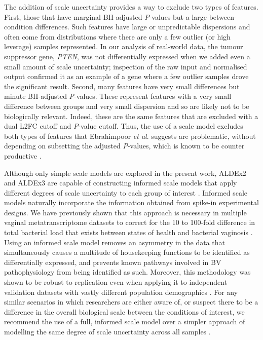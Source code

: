 \documentclass[10pt,letterpaper]{article}
\begin{document}
The addition of scale uncertainty provides a way to exclude two types of features. First, those that have marginal BH-adjusted \textit{P}-values but a large between-condition differences. Such features have large or unpredictable dispersions and often come from distributions where there are only a few outlier (or high leverage) samples represented. In our analysis of real-world data, the tumour suppressor gene, \textit{PTEN}, was not differentially expressed when we added even a small amount of scale uncertainty; inspection of the raw input and normalised output confirmed it as an example of a gene where a few outlier samples drove the significant result. Second, many features have very small differences but minute BH-adjusted \textit{P}-values. These represent features with a very small difference between groups and very small dispersion and so are likely not to be biologically relevant. Indeed, these are the same features that are excluded with a dual L2FC cutoff and \textit{P}-value cutoff. Thus, the use of a scale model excludes both types of features that Ebrahimpoor \textit{et al}. \cite{ebrahimpoor_inflated_2021} suggests are problematic, without depending on subsetting the adjusted \textit{P}-values, which is known to be counter productive \cite{Goeman:2014aa, ebrahimpoor_inflated_2021}.

Although only simple scale models are explored in the present work, ALDEx2 and ALDEx3 are capable of constructing informed scale models that apply different degrees of scale uncertainty to each group of interest \cite{nixon_scale_2024, nixon_incorporating_2025}. Informed scale models naturally incorporate the information obtained from spike-in experimental designs. We have previously shown\cite{dos_santos_vaginal_2024, dos_santos_incorporating_2026} that this approach is necessary in multiple vaginal metatranscriptome datasets to correct for the 10 to 100-fold difference in total bacterial load that exists between states of health and bacterial vaginosis \cite{zozaya-hinchliffe_quantitative_2010}. Using an informed scale model removes an asymmetry in the data that simultaneously causes a multitude of housekeeping functions to be identified as differentially expressed, and prevents known pathways involved in BV pathophysiology from being identified as such. Moreover, this methodology was shown to be robust to replication even when applying it to independent validation datasets with vastly different population demographics \cite{dos_santos_vaginal_2024}. For any similar scenarios in which researchers are either aware of, or suspect there to be a difference in the overall biological scale between the conditions of interest, we recommend the use of a full, informed scale model over a simpler approach of modelling the same degree of scale uncertainty across all samples \cite{dos_santos_incorporating_2026}.
\end{document}
